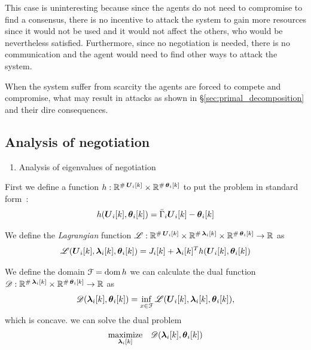 \documentclass[../main.tex]{subfiles}
\begin{document}
This case is uninteresting because since the agents do not need to compromise to find a consensus, there is no incentive to attack the system to gain more resources since it would not be used and it would not affect the others, who would be nevertheless satisfied.
Furthermore, since no negotiation is needed, there is no communication and the agent would need to find other ways to attack the system.

When the system suffer from scarcity the agents are forced to compete and compromise, what may result in attacks as shown in \S\ref{sec:primal_decomposition} and their dire consequences.

\subsection{Analysis of negotiation}\label{sec:analysis-negotiation}



\begin{enumerate}
  \item Analysis of eigenvalues of negotiation
\end{enumerate}
\newcommand{\lagrangianname}{\mathscr{L}}
\newcommand{\lagrangian}{\lagrangianname(\vec{U}_{i}[k],\lambdaik,\thetaik)}
\newcommand{\dualfunctionname}{\mathscr{D}}
\newcommand{\dualfunction}{\dualfunctionname(\lambdaik,\thetaik)}
\newcommand{\equalityfunctionname}{h}
\newcommand{\equalityfunction}{\equalityfunctionname(\vec{U}_{i}[k],\thetaik)}

First we define a function $\equalityfunctionname:\R^{\card\vec{U}_{i}[k]}\times \R^{\card\thetaik}$ to put the problem in standard form~\cite{BoydVandenberghe2004}:
\begin{equation}
  \label{eq:lagrangian_equality}
  \equalityfunction=\bar{\Gamma}_{i}\vec{U}_i[k]-\thetaik
\end{equation}


We define the \emph{Lagrangian} function $\lagrangianname : \R^{\card\vec{U}_{i}[k]}\times \R^{\card\lambdaik} \times \R^{\card\thetaik} \to \R$ as
\begin{equation}
  \label{eq:lagrangian_equality}
  \lagrangian=\obji+\lambdaik^T\equalityfunction
\end{equation}

We define the domain $\set{F}=\dom \equalityfunctionname$
we can calculate the dual function $\dualfunctionname:\R^{\card\lambdaik} \times \R^{\card\thetaik} \to \R$ as
\begin{equation}
  \label{eq:dual_function_equality}
  \dualfunction=\inf_{x\in\set{F}} \lagrangian,
\end{equation}
which is concave.
we can solve the dual problem
\begin{equation}
  \begin{matrix}
    \underset{\lambdaik}{\mathrm{maximize}}&\dualfunction\\
  \end{matrix}
\end{equation}
\end{document}
